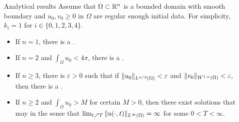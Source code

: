 \begin{frame}{Analytical results}
Assume that $\Omega\subset\mathbb{R}^n$ is a bounded domain with smooth boundary and $u_0, v_0\ge 0$ in $\Omega$ are regular enough initial data. For simplicity, $k_i=1$ for $i\in\{0,1,2,3,4\}$.

\begin{itemize}
    \setlength{\itemsep}{0.5em}
    \item<2-> If \alert{$n=1$}, there is a .
    \item<3-> If \alert{$n=2$} and \alert{$\int_\Omega u_0 < 4\pi$}, there is a .
    \item<4-> If \alert{$n\ge 3$}, there is $\varepsilon>0$ such that if \alert{$\| u_0\|_{L^{n/2}(\Omega)} < \varepsilon$} and \alert{$\| v_0\|_{W^{1,n}(\Omega)} < \varepsilon$}, then there is a .
    \item<5-> If \alert{$n\ge 2$} and \alert{$\int_\Omega u_0>M$} for certain $M>0$, then there exist solutions that may  in the sense that \alert{$\lim_{t\nearrow T} \| u(\cdot,t)\|_{L^\infty(\Omega)}=\infty$} for some $0<T<\infty$.
\end{itemize}
\end{frame}

